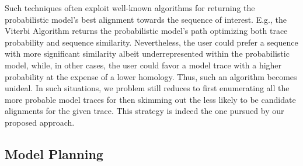 Such techniques often exploit well-known algorithms for returning the probabilistic model's best alignment towards the sequence of interest. E.g., the Viterbi Algorithm \cite{Viterbi67} returns the probabilistic model's path optimizing both trace probability and sequence similarity.  Nevertheless, the user could prefer a sequence with more significant similarity albeit underrepresented within the probabilistic model, while, in other cases, the user could favor a model trace with a higher probability at the expense of a lower homology. Thus, such an algorithm becomes unideal. In such situations, we problem still reduces to first enumerating all the more probable model traces for then skimming out the less likely to be candidate alignments for the given trace. This strategy is indeed the one pursued by our proposed approach. 


\subsection{Model Planning}